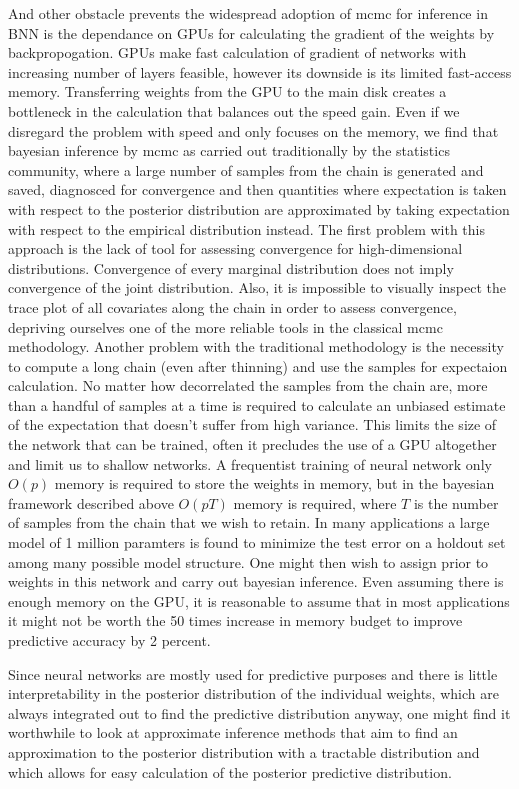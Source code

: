 \documentclass{book}
\begin{document}
\begin{enumerate}
And other obstacle prevents the widespread adoption of mcmc for inference in BNN
is the dependance on GPUs for calculating the gradient of the weights by
backpropogation. GPUs make fast calculation of gradient of networks with
increasing number of layers feasible, however its downside is its limited
fast-access memory. Transferring weights from the GPU to the main disk creates a
bottleneck in the calculation that balances out the speed gain. Even if we
disregard the problem with speed and only focuses on the memory, we find that
bayesian inference by mcmc as carried out traditionally by the statistics
community, where a large number of samples from the chain is generated and
saved, diagnosced for convergence and then quantities where expectation is taken
with respect to the posterior distribution are approximated by taking
expectation with respect to the empirical distribution instead. The first
problem with this approach is the lack of tool for assessing convergence for
high-dimensional distributions. Convergence of every marginal distribution does
not imply convergence of the joint distribution. Also, it is impossible to
visually inspect
the trace plot of all covariates along the chain in order to assess convergence,
depriving ourselves one of the more reliable tools in the classical mcmc
methodology. Another problem with the traditional methodology is the necessity
to compute a long chain (even after thinning) and use the samples for expectaion
calculation. No matter how decorrelated the samples from the chain are,
more than a handful of samples at a time is required to calculate an unbiased
estimate of the expectation that doesn't suffer from high variance. This limits
the size of the network that can be trained, often it precludes the use of a GPU
altogether and limit us to shallow networks. A frequentist training of neural
network only $O(p)$ memory is required to store the weights in memory, but in
the bayesian framework described above $O(pT)$ memory is required, where $T$ is
the number of samples from the chain that we wish to retain. In many
applications a large
model of 1 million paramters is found to minimize the test error on a holdout
set among many possible model structure. One might then wish to assign prior to
weights in this network and carry out bayesian inference. Even assuming there is
enough memory on the GPU, it is reasonable to assume that in most applications it might not be worth the 50 times increase in memory
budget to improve predictive accuracy by 2 percent. 

Since neural networks are 
mostly used for predictive purposes and there is little interpretability in the
posterior distribution of the individual weights, which are
always integrated out to find the predictive distribution anyway, one might find
it worthwhile to look at approximate inference methods that aim to find
an approximation to the posterior distribution with a tractable distribution and
which allows for easy calculation of the posterior predictive distribution. 


\end{enumerate}
\end{document}
